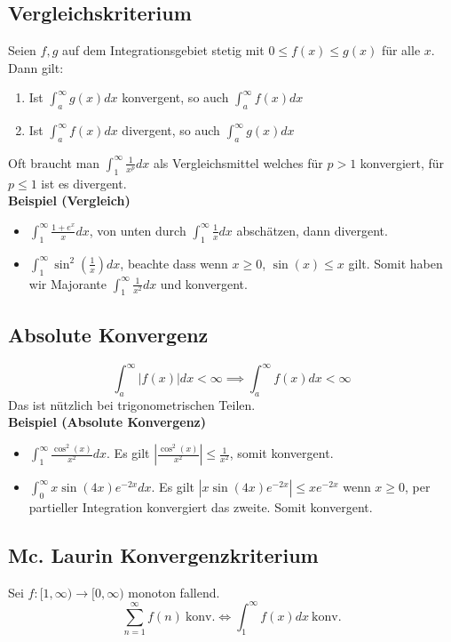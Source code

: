 \documentclass[25pt]{sciposter}
\begin{document}
\begin{multicols}{3}
\subsection*{Vergleichskriterium}
 Seien $f,g$ auf dem Integrationsgebiet stetig mit $0 \leq f(x) \leq g(x)$ für alle $x$. Dann gilt:
 \begin{enumerate}
 	\item Ist $\int_{a}^{\infty} g(x) dx$ konvergent, so auch $\int_{a}^{\infty} f(x) dx$
 	\item Ist $\int_{a}^{\infty} f(x) dx$ divergent, so auch $\int_{a}^{\infty} g(x) dx$
 \end{enumerate}
 Oft braucht man $\int_{1}^{\infty} \frac{1}{x^p} dx$ als Vergleichsmittel welches für $p>1$ konvergiert, für $p \leq 1$ ist es divergent.\\
\textbf{Beispiel (Vergleich)} 
\begin{itemize}
	\item $\int_{1}^{\infty} \frac{1 + e^x}{x} dx$, von unten durch $\int_{1}^{\infty} \frac{1}{x} dx$ abschätzen, dann divergent.
	\item $\int_1 ^\infty \sin^2\left(\frac{1}{x}\right) dx$, beachte dass wenn $x \geq 0$, $\sin(x) \leq x$ gilt. Somit haben wir Majorante $\int_{1}^{\infty} \frac{1}{x^2} dx$ und konvergent. 
\end{itemize}


\subsection*{Absolute Konvergenz}
$$ \int_{a}^{\infty} \left| f(x) \right| dx <\infty \implies \int_{a}^{\infty}f(x) dx < \infty $$
Das ist nützlich bei trigonometrischen Teilen.\\
\textbf{Beispiel (Absolute Konvergenz)} 
\begin{itemize}
	\item $\int_{1}^{\infty} \frac{\cos^2(x)}{x^2} dx$. Es gilt $\left| \frac{\cos^2(x)}{x^2}\right|\leq \frac{1}{x^2}$, somit konvergent.
	\item $\int_0 ^\infty x\sin(4x)e^{-2x} dx$. Es gilt $|x\sin(4x)e^{-2x}| \leq xe^{-2x}$ wenn $x\geq 0$, per partieller Integration konvergiert das zweite. Somit konvergent.
\end{itemize}

\subsection*{Mc. Laurin Konvergenzkriterium}
Sei $f:[1,\infty) \to [0,\infty)$ monoton fallend.
$$\sum_{n=1}^{\infty} f(n) \ \text{konv.}  \iff    \int_{1}^{\infty} f(x) dx \ \text{konv.}$$




\end{multicols}
\end{document}
